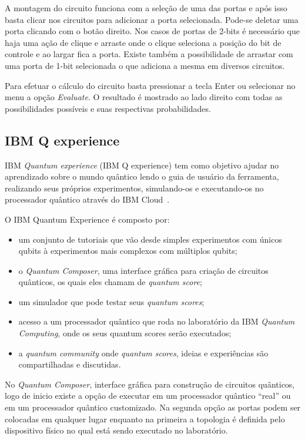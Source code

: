 \documentclass[a4paper, 12pt, oneside]{book}
\begin{document}
A montagem do circuito funciona com a seleção de uma das portas e após isso basta clicar nos circuitos para adicionar a porta selecionada. Pode-se deletar uma porta clicando com o botão direito. Nos casos de portas de 2-bits é necessário que haja uma ação de clique e arraste onde o clique seleciona a posição do bit de controle e ao largar fica a porta. Existe também a possibilidade de arrastar com uma porta de 1-bit selecionada o que adiciona a mesma em diversos circuitos.

Para efetuar o cálculo do circuito basta pressionar a tecla Enter ou selecionar no menu a opção \textit{Evaluate}. O resultado é mostrado ao lado direito com todas as possibilidades possíveis e suas respectivas probabilidades.

\subsection{IBM Q experience}

IBM \textit{Quantum experience} (IBM Q experience) tem como objetivo ajudar no aprendizado sobre o mundo quântico lendo o guia de usuário da ferramenta, realizando seus próprios experimentos, simulando-os e executando-os no processador quântico através do IBM Cloud~\cite{ibmq}.

O IBM Quantum Experience é composto por:
\begin{itemize}
\item um conjunto de tutoriais que vão desde simples experimentos com únicos qubits à experimentos mais complexos com múltiplos qubits;
\item o \textit{Quantum Composer}, uma interface gráfica para criação de circuitos quânticos, os quais eles chamam de \textit{quantum score};
\item um simulador que pode testar seus \textit{quantum scores};
\item acesso a um processador quântico que roda no laboratório da IBM \textit{Quantum Computing}, onde os seus quantum scores serão executados;
\item a \textit{quantum community} onde \textit{quantum scores}, ideias e experiências são compartilhadas e discutidas.
\end{itemize}

No \textit{Quantum Composer}, interface gráfica para construção de circuitos quânticos, logo de inicio existe a opção de executar em um processador quântico ``real'' ou em um processador quântico customizado. Na segunda opção as portas podem ser colocadas em qualquer lugar enquanto na primeira a topologia é definida pelo dispositivo físico no qual está sendo executado no laboratório.
\end{document}
